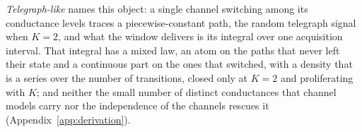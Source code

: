 \emph{Telegraph-like} names this object: a single channel switching among its conductance levels
traces a piecewise-constant path, the random telegraph signal when $K=2$, and what the window
delivers is its integral over one acquisition interval. That integral has a mixed law, an atom on
the paths that never left their state and a continuous part on the ones that switched, with a
density that is a series over the number of transitions, closed only at $K=2$ and proliferating
with $K$; and neither the small number of distinct conductances that channel models carry nor the
independence of the channels rescues it (Appendix~\ref{app:derivation}).
